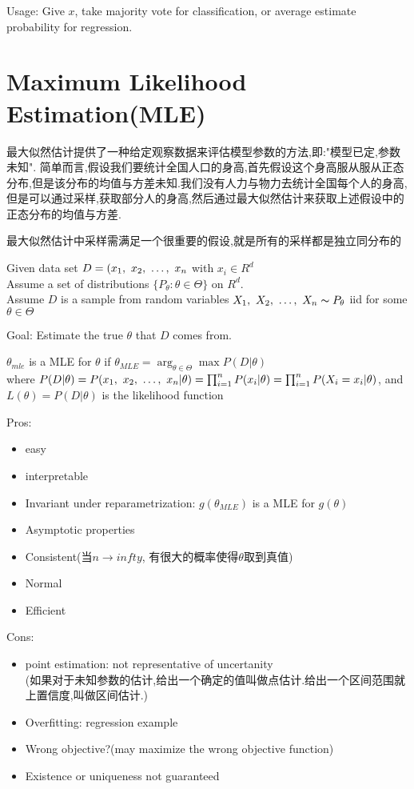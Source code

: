 \documentclass{article}
\begin{document}
Usage:
Give $x$, take majority vote for classification, or average estimate probability for regression.

\section{Maximum Likelihood Estimation(MLE)}
最大似然估计提供了一种给定观察数据来评估模型参数的方法,即:"模型已定,参数未知".
简单而言,假设我们要统计全国人口的身高,首先假设这个身高服从服从正态分布,但是该分布的均值与方差未知.我们没有人力与物力去统计全国每个人的身高,
但是可以通过采样,获取部分人的身高,然后通过最大似然估计来获取上述假设中的正态分布的均值与方差.

最大似然估计中采样需满足一个很重要的假设,就是所有的采样都是独立同分布的

Given data set $D = (x_1,~x_2,~\ldots,~x_n$ with $x_i \in R^d$\\
Assume a set of distributions $\{ P_\theta: \theta \in \Theta \}$ on $R^d$.\\
Assume $D$ is a sample from random variables $X_1,~X_2,~\ldots,~X_n \thicksim{P}_\theta$ iid for some $\theta \in \Theta$

Goal: Estimate the true $\theta$ that $D$ comes from.
\begin{definition}
$\theta_{mle}$ is a MLE for $\theta$ if $\theta_{MLE} = \arg_{\theta \in \Theta} \max P(D|\theta)$ \\
where $P(D|\theta) = P(x_1,~x_2,~\ldots,~x_n | \theta) = \prod_{i = 1}^n P(x_i|\theta) = \prod_{i=1}^n P(X_i = x_i|\theta)$,
and $L(\theta) = P(D|\theta)$ is the likelihood function
\end{definition}

Pros:
\begin{itemize}
\item easy
\item interpretable
\item Invariant under reparametrization: $g(\theta_{MLE})$ is a MLE for $g(\theta)$
\item Asymptotic properties
\item Consistent(当$n \to infty$, 有很大的概率使得$\theta$取到真值)
\item Normal
\item Efficient
\end{itemize}

Cons:
\begin{itemize}
\item point estimation: not representative of uncertanity\\
(如果对于未知参数的估计,给出一个确定的值叫做点估计.给出一个区间范围就上置信度,叫做区间估计.)
\item Overfitting: regression example
\item Wrong objective?(may maximize the wrong objective function)
\item Existence or uniqueness not guaranteed
\end{itemize}
\end{document}
